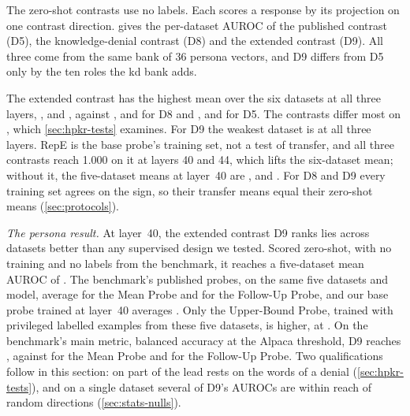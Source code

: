 The zero-shot contrasts use no labels. Each scores a response by its projection on one contrast
direction.  gives the per-dataset AUROC of the published contrast (D5), the
knowledge-denial contrast (D8) and the extended contrast (D9). All three come from the same bank of 36
persona vectors, and D9 differs from D5 only by the ten roles the kd bank adds.

\begin{table}[t]
\centering
\footnotesize
\caption{Zero-shot AUROC per dataset of D5 (8 v 7), D8 (4 v 6) and D9 (12 v 13); the mean includes RepE.}
\label{tab:zs-datasets}
\fittable{}
\end{table}

The extended contrast has the highest mean over the six datasets at all three layers,
,  and , against ,
 and  for D8 and ,  and
 for D5. The contrasts differ most on \hpkr, which \cref{sec:hpkr-tests} examines.
For D9 the weakest dataset is \hpc{} at all three layers. RepE is the base probe's training set, not a
test of transfer, and all three contrasts reach 1.000 on it at layers 40 and 44, which lifts the
six-dataset mean; without it, the five-dataset means at layer~40 are ,
 and . For D8 and D9 every training set agrees on the sign, so their
transfer means equal their zero-shot means (\cref{sec:protocols}).

\emph{The persona result.} At layer~40, the extended contrast D9 ranks lies across datasets better
than any supervised design we tested. Scored zero-shot, with no training and no labels from the
benchmark, it reaches a five-dataset mean AUROC of . The benchmark's published
probes, on the same five datasets and model, average  for the Mean Probe and
 for the Follow-Up Probe, and our base probe trained at layer~40 averages
. Only the Upper-Bound Probe, trained with privileged labelled examples from these
five datasets, is higher, at . On the benchmark's main metric, balanced accuracy
at the Alpaca threshold, D9 reaches , against  for the Mean
Probe and  for the Follow-Up Probe. Two qualifications follow in this
section: on \hpkr{} part of the lead rests on the words of a denial (\cref{sec:hpkr-tests}), and on a
single dataset several of D9's AUROCs are within reach of random directions (\cref{sec:stats-nulls}).

